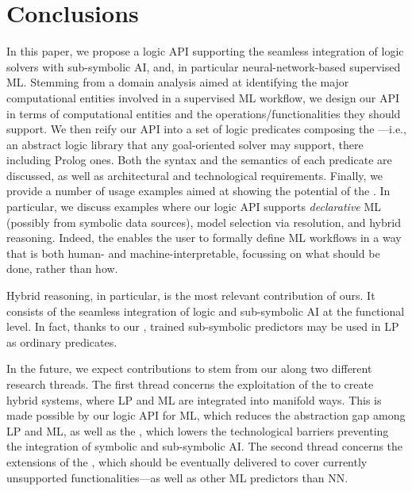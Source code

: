 \documentclass[
]{ceurart}
\begin{document}


\section{Conclusions}
\label{sec:conclusions}

In this paper, we propose a logic API supporting the seamless integration of logic solvers with sub-symbolic AI, and, in particular neural-network-based supervised ML.
%
Stemming from a domain analysis aimed at identifying the major computational entities involved in a supervised ML workflow, we design our API in terms of computational entities and the operations/functionalities they should support.
%
We then reify our API into a set of logic predicates composing the \mllib{}---i.e., an abstract logic library that any goal-oriented solver may support, there including Prolog ones.
%
Both the syntax and the semantics of each predicate are discussed, as well as architectural and technological requirements.
%
Finally, we provide a number of usage examples aimed at showing the potential of the \mllib.
%
In particular, we discuss examples where our logic API supports \emph{declarative} ML (possibly from symbolic data sources), model selection via resolution, and hybrid reasoning.
%
Indeed, the \mllib{} enables the user to formally define ML workflows in a way that is both human- and machine-interpretable, focussing on what should be done, rather than how.

Hybrid reasoning, in particular, is the most relevant contribution of ours.
%
It consists of the seamless integration of logic and sub-symbolic AI at the functional level.
%
In fact, thanks to our \mllib{}, trained sub-symbolic predictors may be used in LP as ordinary predicates.


In the future, we expect contributions to stem from our \mllib{} along two different research threads.
%
The first thread concerns the exploitation of the \mllib{} to create hybrid systems, where LP and ML are integrated into manifold ways.
%
This is made possible by our logic API for ML, which reduces the abstraction gap among LP and ML, as well as the \mllib, which lowers the technological barriers preventing the integration of symbolic and sub-symbolic AI.
%
The second thread concerns the extensions of the \mllib{}, which should be eventually delivered to cover currently unsupported functionalities---as well as other ML predictors than NN.
\end{document}
